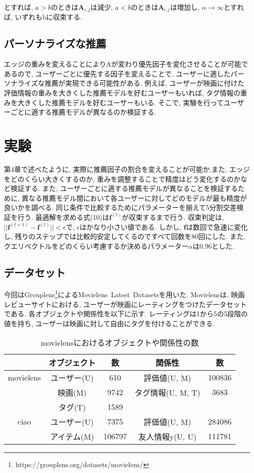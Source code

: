 \documentclass[a4j,11pt]{jarticle}           %
\begin{document}
	とすれば, $a>b$のときは$\textbf{A}_{i,j}$は減少, $a<b$のときは$\textbf{A}_{i,j}$は増加し, $\alpha \rightarrow \infty$とすれば, いずれもbに収束する.
	
	
	
	\subsection{パーソナライズな推薦}
	エッジの重みを変えることによりAが変わり優先因子を変化させることが可能であるので, ユーザーごとに優先する因子を変えることで, ユーザーに適したパーソナライズな推薦が実現できる可能性がある. 例えば, ユーザーが映画に付けた評価情報の重みを大きくした推薦モデルを好むユーザーもいれば, タグ情報の重みを大きくした推薦モデルを好むユーザーもいる. そこで, 実験を行ってユーザーごとに適する推薦モデルが異なるのか検証する. 
	\newpage
	
	\section{実験}
	第4章で述べたように, 実際に推薦因子の割合を変えることが可能か,また, エッジをどのくらい大きくするのか, 重みを調整することで精度はどう変化するのかなど検証する. また, ユーザーごとに適する推薦モデルが異なることを検証するために, 異なる推薦モデル間において各ユーザーに対してどのモデルが最も精度が良いかを調べる. 
	同じ条件で比較するためにパラメーターを揃えて5分割交差検証を行う. 最適解を求める式(10)は$\textbf{f}^{(t)}$が収束するまで行う. 
	収束判定は, $||\textbf{f}^{(t+1)}-\textbf{f}^{(t)}||<\epsilon$で, $\epsilon$はかなり小さい値である. 
	しかし, $\textbf{f}$は数回で急速に変化し, 残りのステップでは比較的安定してくるのですべて回数を80回にした. また, クエリベクトルをどのくらい考慮するか決めるパラメーター$\alpha$は0.96とした. 
	\subsection{データセット}
	今回はGrouplens\footnote{https://grouplens.org/datasets/movielens/}によるMovielens\ Latest\ Datasetsを用いた. 
	Movielensは, 映画レビューサイトにおける, ユーザーが映画にレーティングをつけたデータセットである. 各オブジェクトや関係性を以下に示す. 
	レーティングは1から5の5段階の値を持ち, ユーザーは映画に対して自由にタグを付けることができる. 
	
	\begin{table}[htbp]
		\centering
		\caption{movielensにおけるオブジェクトや関係性の数}
		\begin{tabular}{ccccc}\hline
			&オブジェクト&数&関係性&数 \\ \hline
			movielens&ユーザー(U)&610&評価値(U, M)&100836\\
			&映画(M)&9742&タグ情報(U, M, T)&3683\\
			&タグ(T)&1589\\ \hline
			ciao&ユーザー(U)&7375&評価値(U, M)&284086\\
			&アイテム(M)&106797&友人情報y(U, U)&111781\\ \hline
		\end{tabular}
	\end{table}
	
\end{document}
